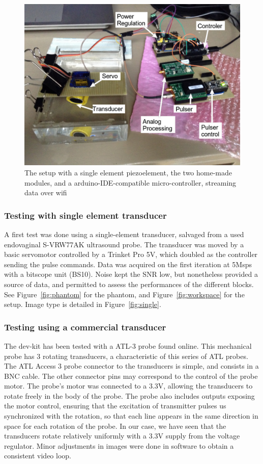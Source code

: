\documentclass[letterpaper, 10 pt, conference]{ieeeconf} %
\begin{document}
\begin{figure}%
\centering
\includegraphics[width=.8\linewidth]{kit-overaview}
\caption{The setup with a single element piezoelement, the two home-made modules, and a arduino-IDE-compatible micro-controller, streaming data over wifi}
\label{fig:wireless}
\end{figure}


\subsubsection{Testing with single element transducer}

A first test was done using a single-element transducer, salvaged from a used endovaginal S-VRW77AK ultrasound probe. The transducer was moved by a basic servomotor controlled by a Trinket Pro 5V, which doubled as the controller sending the pulse commands. Data was acquired on the first iteration at 5Msps with a bitscope unit (BS10). Noise kept the SNR low, but nonetheless provided a source of data, and permitted to assess the performances of the different blocks. See Figure~\ref{fig:phantom} for the phantom, and Figure~\ref{fig:workspace} for the setup. Image type is detailed in Figure~\ref{fig:single}.

\subsubsection{Testing using a commercial transducer}

The dev-kit has been tested with a ATL-3 probe found online. This mechanical probe has 3 rotating transducers, a characteristic of this series of ATL probes. The ATL Access 3 probe connector to the transducers is simple, and consists in a BNC cable. The other connector pins may correspond to the control of the probe motor. The probe's motor was connected to a 3.3V, allowing the transducers to rotate freely in the body of the probe. The probe also includes outputs exposing the motor control, ensuring that the excitation of transmitter pulses us synchronized with the rotation, so that each line appears in the same direction in space for each rotation of the probe. In our case, we have seen that the transducers rotate relatively uniformly with a 3.3V supply from the voltage regulator. Minor adjustments in images were done in software to obtain a consistent video loop.
\end{document}

